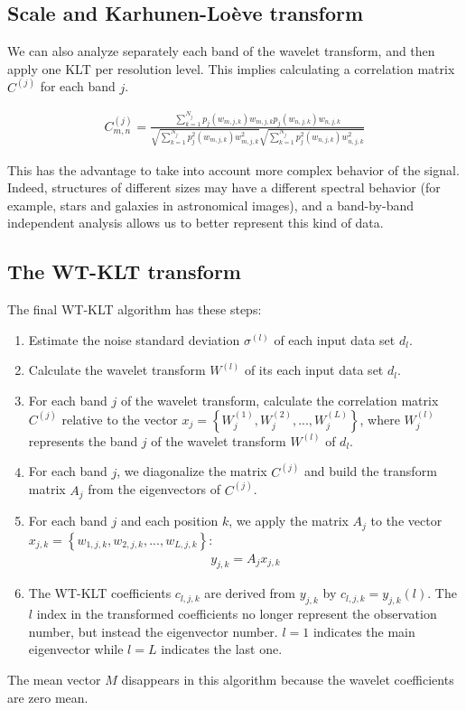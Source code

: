 \subsection{Scale and Karhunen-Lo\`eve transform}

We can also analyze separately each band of the 
wavelet transform, and then apply one KLT per resolution level. This 
implies calculating a correlation matrix $C^{(j)}$ for each band $j$.

\begin{eqnarray}
C^{(j)}_{m,n} =   
 {\frac{\sum_{k=1}^{N_j} p_j(w_{m,j,k}) w_{m,j,k} p_j(w_{n,j,k}) w_{n,j,k}}
                      {\sqrt{\sum_{k=1}^{N_j}  p^2_j(w_{m,j,k}) w^2_{m,j,k}}  \sqrt{\sum_{k=1}^{N_j} p^2_j(w_{n,j,k}) w^2_{n,j,k}}}}
\label{Correlation_matrix3}
\end{eqnarray}

This has the advantage to take into account more complex behavior of the
signal. Indeed, structures of different sizes may have a different 
spectral behavior (for example, stars and galaxies in astronomical images),
and a band-by-band independent analysis allows us to better represent
this kind of data.


\subsection{The WT-KLT transform}
The final WT-KLT algorithm has these steps:
\begin{enumerate}
\item Estimate the noise standard deviation $\sigma^{(l)}$ of each input
data set $d_l$.
\item Calculate the wavelet transform $W^{(l)}$ of its each input
data set $d_l$.
\item For each band $j$ of the wavelet transform, calculate
the correlation matrix $C^{(j)}$ relative to the vector 
$x_j = \left\{ W^{(1)}_j, W^{(2)}_j, ..., W^{(L)}_j \right\}$, where 
$W^{(l)}_j$ represents the band $j$ of the wavelet transform $W^{(l)}$ of $d_l$.
\item For each band $j$, we diagonalize the matrix $C^{(j)}$ and build the
transform matrix $A_j$ from the eigenvectors of $C^{(j)}$.
\item For each band $j$ and each position $k$, we apply the matrix $A_j$
to the vector
$x_{j,k} = \left\{ w_{1,j,k}, w_{2,j,k}, ..., w_{L,j,k} \right\}$:
\begin{eqnarray}
  y_{j,k} = A_j x_{j,k}
\end{eqnarray}
\item The WT-KLT coefficients $c_{l,j,k}$ are derived from $y_{j,k}$ by
$c_{l,j,k} = y_{j,k}(l)$. The $l$ index in the transformed coefficients
no longer represent the observation number, but instead the 
eigenvector number.
$l=1$ indicates the main eigenvector while $l=L$  indicates  the last one.
\end{enumerate}
The mean vector $M$ disappears in this algorithm because the wavelet 
coefficients are zero mean.


